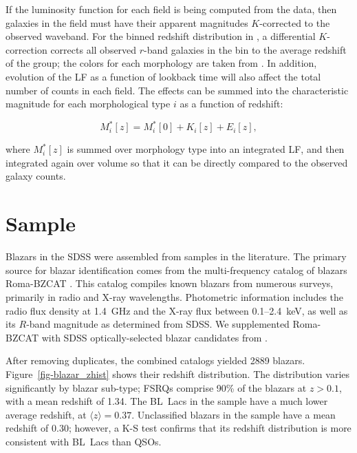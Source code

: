 \documentclass[useAMS,usenatbib]{mn2e}
\begin{document}
If the luminosity function for each field is being computed from the data, then galaxies in the field must have their apparent magnitudes $K$-corrected to the observed waveband. For the binned redshift distribution in \citet{yee87}, a differential $K$-correction corrects all observed $r$-band galaxies in the bin to the average redshift of the group; the colors for each morphology are taken from \citet{seb86}. In addition, evolution of the LF as a function of lookback time will also affect the total number of counts in each field. The effects can be summed into the characteristic magnitude for each morphological type $i$ as a function of redshift:

\begin{equation}
\label{eqn-mstar_morph}
M_i^*[z] = M_i^*[0] + K_i[z] + E_i[z],
\end{equation}

\noindent where $M_i^*[z]$ is summed over morphology type into an integrated LF, and then integrated again over volume so that it can be directly compared to the observed galaxy counts. 


\section{Sample}\label{sec-sample}

Blazars in the SDSS were assembled from samples in the literature. The primary source for blazar identification comes from the multi-frequency catalog of blazars Roma-BZCAT \citep{mas09}. This catalog compiles known blazars from numerous surveys, primarily in radio and X-ray wavelengths. Photometric information includes the radio flux density at 1.4~GHz and the X-ray flux between 0.1--2.4~keV, as well as its $R$-band magnitude as determined from SDSS. We supplemented Roma-BZCAT with SDSS optically-selected blazar candidates from \citet{plo10}. 

After removing duplicates, the combined catalogs yielded 2889 blazars. Figure~\ref{fig-blazar_zhist} shows their redshift distribution. The distribution varies significantly by blazar sub-type; FSRQs comprise 90\% of the blazars at $z>0.1$, with a mean redshift of 1.34. The BL~Lacs in the sample have a much lower average redshift, at $\langle z\rangle=0.37$. Unclassified blazars in the sample \citep[``QSO candidates'', as defined by][]{mas09} have a mean redshift of 0.30; however, a K-S test confirms that its redshift distribution is more consistent with BL~Lacs than QSOs. 
\end{document}
